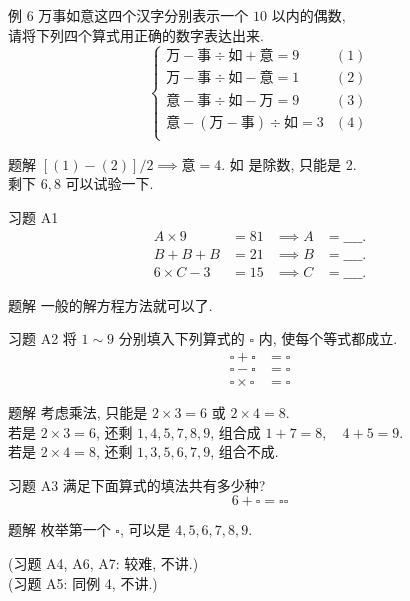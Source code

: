 \documentclass[content.tex]{subfiles}
\begin{document}
\begin{frame}{例 6}
万事如意这四个汉字分别表示一个 $10$ 以内的偶数, \\
请将下列四个算式用正确的数字表达出来.
$$
\begin{cases}
\text{万} - \text{事} \div \text{如} + \text{意} = 9 & (1)\\
\text{万} - \text{事} \div \text{如} - \text{意} = 1 & (2)\\
\text{意} - \text{事} \div \text{如} - \text{万} = 9 & (3) \\
\text{意} - (\text{万} - \text{事}) \div \text{如} = 3 & (4) \\
\end{cases}
$$
\begin{exampleblock}{题解}
$[(1) - (2)] / 2 \implies \text{意} = 4$. 
$\text{如}$ 是除数, 只能是 $2$. \\
剩下 $6, 8$ 可以试验一下.
\end{exampleblock}
\end{frame}

\begin{frame}{习题 A1}
\begin{align*}
A\times 9 &= 81&\implies A&=\_\_\_\_. \\
B+B+B&=21&\implies B&=\_\_\_\_. \\
6\times C - 3 &= 15&\implies C &= \_\_\_\_.
\end{align*}
\begin{exampleblock}{题解}
一般的解方程方法就可以了.
\end{exampleblock}
\end{frame}

\begin{frame}{习题 A2}
将 $1 \sim 9$ 分别填入下列算式的 $\square$ 内, 
使每个等式都成立.
\begin{align*}
\square + \square &= \square \\
\square - \square &= \square \\
\square \times \square &= \square
\end{align*}
\begin{exampleblock}{题解}
考虑乘法, 只能是 $2\times 3 = 6$ 或 $2\times 4 = 8$. \\
若是 $2\times 3 = 6$, 还剩 $1,4,5,7,8,9$, 
组合成 $1 + 7 = 8,\quad 4 + 5 = 9$. \\
若是 $2\times 4 = 8$, 还剩 $1,3,5,6,7,9$, 组合不成.
\end{exampleblock}
\end{frame}

\begin{frame}{习题 A3}
满足下面算式的填法共有多少种?
$$6 + \square = \square \square$$
\begin{exampleblock}{题解}
枚举第一个 $\square$, 可以是 $4,5,6,7,8,9$.
\end{exampleblock}
\centering 
(习题 A4, A6, A7: 较难, 不讲.) \\
(习题 A5: 同例 4, 不讲.) \\
\end{frame}
\end{document}

